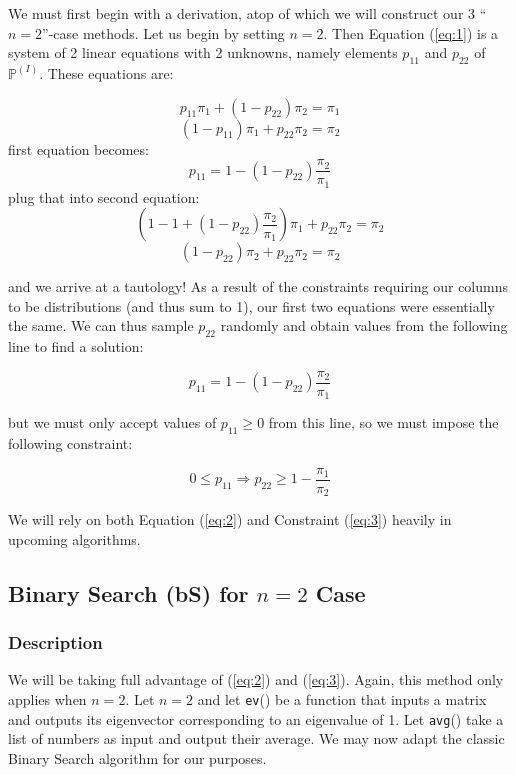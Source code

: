 \documentclass{article}
\begin{document}
We must first begin with a derivation, atop of which we will construct our 3 ``$n=2$''-case methods. Let us begin by setting $n=2$. Then Equation (\ref{eq:1}) is a system of 2 linear equations with 2 unknowns, namely elements $p_{11}$ and $p_{22}$ of $\mathbb{P}^{(I)}$. These equations are:

\[
p_{11}\pi_1 + (1-p_{22})\pi_2 = \pi_1
\]\[
(1-p_{11})\pi_1 + p_{22}\pi_2 = \pi_2
\]
first equation becomes:
\[
p_{11} = 1 - (1-p_{22})\frac{\pi_2}{\pi_1}
\]
plug that into second equation:
\[
(1-1 + (1-p_{22})\frac{\pi_2}{\pi_1})\pi_1 + p_{22}\pi_2 = \pi_2
\]\[
(1-p_{22})\pi_2 + p_{22}\pi_2 = \pi_2
\]

and we arrive at a tautology! As a result of the constraints requiring our columns to be distributions (and thus sum to 1), our first two equations were essentially the same. We can thus sample $p_{22}$ randomly and obtain values from the following line to find a solution:

\begin{equation}\label{eq:2}
   p_{11} = 1 - (1-p_{22})\frac{\pi_2}{\pi_1}
\end{equation}

but we must only accept values of $p_{11} \geq 0$ from this line, so we must impose the following constraint:

\begin{equation}\label{eq:3}
    0 \leq p_{11} \Rightarrow p_{22} \geq 1-\frac{\pi_1}{\pi_2}
\end{equation}

We will rely on both Equation (\ref{eq:2}) and Constraint (\ref{eq:3}) heavily in upcoming algorithms.

\subsection{Binary Search (bS) for $n=2$ Case}
\subsubsection{Description}
We will be taking full advantage of (\ref{eq:2}) and (\ref{eq:3}). Again, this method only applies when $n=2$. Let $n=2$ and let \texttt{ev}() be a function that inputs a matrix and outputs its eigenvector corresponding to an eigenvalue of 1. Let \texttt{avg}() take a list of numbers as input and output their average. We may now adapt the classic Binary Search algorithm for our purposes.
\end{document}
